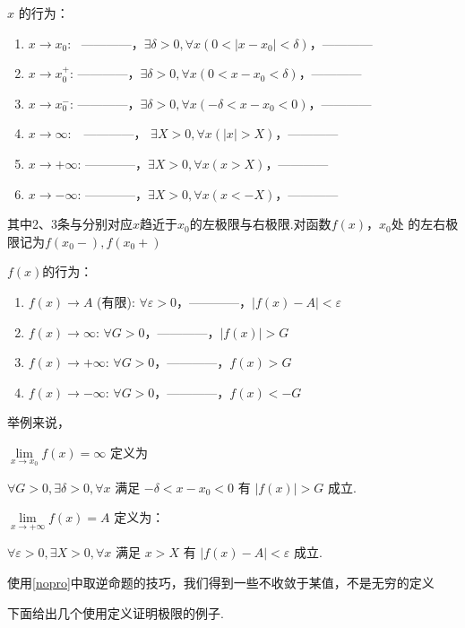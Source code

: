 \begin{definition}
	$x$ 的行为：
	
	\begin{enumerate}
		\item $x \to x_0$:~ ————，$\exists \delta > 0, \forall x (0 < |x - x_0| < \delta)$，————
		\item $x \to x_0^+$: ————，$\exists \delta > 0, \forall x (0 < x - x_0 < \delta)$，————
		\item $x \to x_0^-$: ————，$\exists \delta > 0, \forall x (-\delta < x - x_0 < 0)$，————
		\item $x \to \infty$:~~————， $\exists X > 0, \forall x (|x| > X)$，————
		\item $x \to +\infty$: ————，$\exists X > 0, \forall x (x > X)$，————
		\item $x \to -\infty$: ————，$\exists X > 0, \forall x (x < -X)$，————
	\end{enumerate}
	
	其中2、3条与分别对应$x$趋近于$x_0$的左极限与右极限.对函数$f(x)$，$x_0$处 的左右极限记为$f(x_0-),f(x_0+)$
	
	$f(x)$的行为：
	
	\begin{enumerate}
		\item $f(x) \to A$ (有限): $\forall \varepsilon > 0$，————，$  |f(x) - A| < \varepsilon$
		\item $f(x) \to \infty$: $\forall G > 0$，————，$|f(x)| > G$
		\item $f(x) \to +\infty$: $\forall G > 0$，————，$ f(x) > G$
		\item $f(x) \to -\infty$: $\forall G > 0$，————，$ f(x) < -G$
	\end{enumerate}
\end{definition}
举例来说，

$\lim\limits_{x \to x_0} f(x) = \infty$ 定义为

$\forall G > 0, \exists \delta > 0, \forall x$ 满足 $-\delta < x - x_0 < 0$ 有 $|f(x)| > G$ 成立.

$\lim\limits_{x \to +\infty} f(x) = A$ 定义为：

$\forall \varepsilon > 0, \exists X > 0, \forall x$ 满足 $x > X$ 有 $|f(x) - A| < \varepsilon$ 成立.

使用\ref{nopro}中取逆命题的技巧，我们得到一些不收敛于某值，不是无穷的定义

下面给出几个使用定义证明极限的例子.

